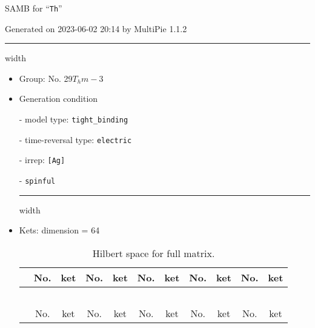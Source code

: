 \documentclass[fleqn,10pt,landscape]{article}
\begin{document}
\setcounter{MaxMatrixCols}{16}

\setlength{\baselineskip}{16pt}
\footnotesize
\begin{center}
\LARGE
SAMB for ``\texttt{Th}''
\end{center}
\begin{flushright}
Generated on 2023-06-02 20:14 by MultiPie 1.1.2
\end{flushright}
\vspace{1cm}


 \hfil \hrule height 1mm width \textwidth \hfil

\begin{itemize}
\item Group: No. 29\quad$T_{h}$\quad$m-3$\quad[ cubic ]

\vspace{5mm}

\item Generation condition

\quad - model type: \texttt{tight_binding}

\quad - time-reversal type: \texttt{electric}

\quad - irrep: \texttt{[Ag]}

\quad - \texttt{spinful}


 \hfil \hrule height 1mm width \textwidth \hfil

\item Kets: dimension = 64
\begin{center}
\renewcommand{\arraystretch}{1.3}
\begin{longtable}{c|cc|cc|cc|cc|cc}
\caption{Hilbert space for full matrix.}
 \\
 \hline \hline
 & No. & ket & No. & ket & No. & ket & No. & ket & No. & ket \\ \hline \endfirsthead

\multicolumn{10}{l}{\tablename\ \thetable{}} \\
 \hline \hline
 & No. & ket & No. & ket & No. & ket & No. & ket & No. & ket \\ \hline \endhead


\end{longtable}
\end{center}
\end{itemize}
\end{document}
